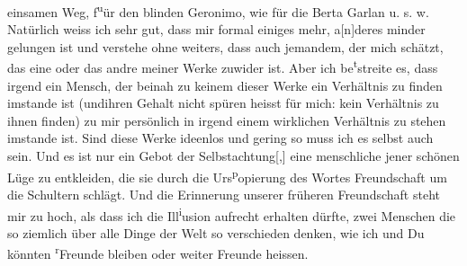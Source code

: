 \begin{ledgroupsized}[t]{13cm}
                  einsamen Weg, f\substVorne{}\textsuperscript{u}\substDazwischen{}ü\substHinten{}r den blinden Geronimo, wie für die Berta Garlan u. s. w. Natürlich weiss ich sehr
               gut, dass mir formal einiges mehr, a{[}n{]}deres minder gelungen ist
               und verstehe ohne weiters, dass auch jemand\introOben{}em\introOben{}, der mich
               schätzt, das eine oder das andre meiner Werke zuwider ist. Aber ich be\substVorne{}\textsuperscript{t}\substDazwischen{}st\substHinten{}reite es, dass irgend ein Mensch, der beinah zu keinem dieser Werke ein
               Verhältnis zu finden imstande ist (un\introOben{}d\introOben{}{ }ihren Gehalt nicht spüren heisst für mich\introOben{}:\introOben{} kein Verhältnis zu ihnen finden) zu mir persönlich in
               irgend einem wirklichen Verhältnis zu stehen imstande {\pb}ist. Sind diese Werke ideenlos und
               gering so muss ich es selbst auch sein. Und es ist nur ein Gebot der
                  Selbstachtung{[},{]} eine menschliche \label{T_L03520-3v}\label{T_L03520-3h} jener schönen Lüge zu
               entkleiden, die sie durch die Urs\substVorne{}\textsuperscript{p}\substDazwischen{}o\substHinten{}pierung des  Wortes Freundschaft um
               die Schultern schlägt. Und die Erinnerung unserer früheren Freundschaft steht \introOben{}mi\introOben{}r zu hoch, als dass ich die Ill\substVorne{}\textsuperscript{i}\substDazwischen{}u\substHinten{}sion aufrecht erhalten dürfte, zwei Menschen die so ziemlich über alle Dinge
               der Welt so verschieden denken, wie ich und Du könnten \substVorne{}\textsuperscript{r}\substDazwischen{}F\substHinten{}reunde bleiben oder weiter Freunde heissen.\pend
           
         
         \endnumbering{}\end{ledgroupsized}\begin{anhang}\end{anhang}\newcommand{\dateiname}{L03520}\newcommand{\titel}{Arthur Schnitzler an Paul Goldmann, nicht abgesandt, 28. 1. 1907}\newcommand{\editorInnen}{Martin Anton Müller und Laura Untner}
      